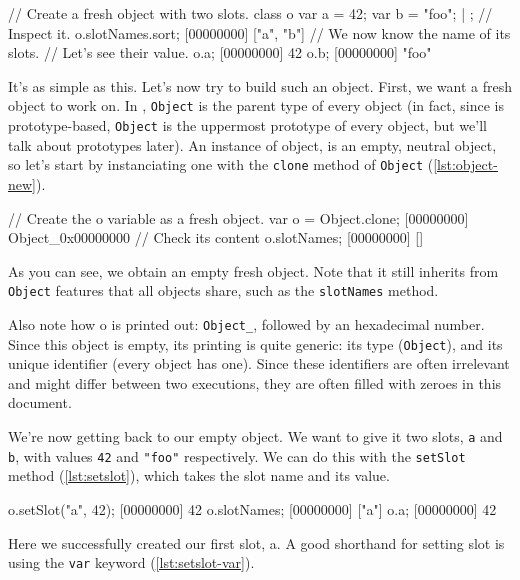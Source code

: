 \documentclass[openright,twoside,12pt]{report}
\begin{document}
\begin{urbiscript}[caption=Inspecting an \urbi object,label=lst:object-slots]
// Create a fresh object with two slots.
class o { var a = 42; var b = "foo"; } | {};
// Inspect it.
o.slotNames.sort;
[00000000] ["a", "b"]
// We now know the name of its slots.
// Let's see their value.
o.a;
[00000000] 42
o.b;
[00000000] "foo"
\end{urbiscript}

It's as simple as this. Let's now try to build such an object. First,
we want a fresh object to work on. In \urbi, \texttt{Object} is the
parent type of every object (in fact, since \urbi is prototype-based,
\texttt{Object} is the uppermost prototype of every object, but we'll
talk about prototypes later). An instance of object, is an empty,
neutral object, so let's start by instanciating one with the
\texttt{clone} method of \texttt{Object} (\autoref{lst:object-new}).

\begin{urbiscript}[caption=Instanciating a new object,
  label=lst:object-new, name=object-slots]
// Create the o variable as a fresh object.
var o = Object.clone;
[00000000] Object_0x00000000
// Check its content
o.slotNames;
[00000000] []
\end{urbiscript}

As you can see, we obtain an empty fresh object. Note that it still
inherits from \texttt{Object} features that all objects share, such as
the \texttt{slotNames} method.

Also note how o is printed out: \texttt{Object\_}, followed by an
hexadecimal number. Since this object is empty, its printing is quite
generic: its type (\texttt{Object}), and its unique identifier (every
\urbi object has one). Since these identifiers are often irrelevant
and might differ between two executions, they are often filled with
zeroes in this document.

We're now getting back to our empty object. We want to give it two
slots, \texttt{a} and \texttt{b}, with values \lstinline|42| and
\lstinline|"foo"| respectively. We can do this with the
\texttt{setSlot} method (\autoref{lst:setslot}), which takes the slot name and
its value.

\begin{urbiscript}[caption=Defining slots, label=lst:setslot,
  name=object-slots]
o.setSlot("a", 42);
[00000000] 42
o.slotNames;
[00000000] ["a"]
o.a;
[00000000] 42
\end{urbiscript}

Here we successfully created our first slot, a. A good shorthand for
setting slot is using the \texttt{var} keyword (\autoref{lst:setslot-var}).
\end{document}
